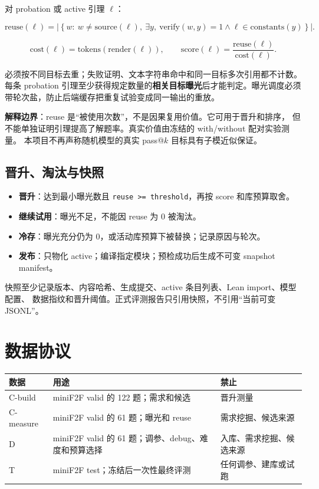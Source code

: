 \documentclass[UTF8,a4paper,11pt,fontset=windows]{ctexart}
\newcommand{\code}[1]{\texttt{\small #1}}
\begin{document}
对 probation 或 active 引理 $\ell$：

\[
\mathrm{reuse}(\ell)=
\left|\left\{w:\ w\ne\mathrm{source}(\ell),\
\exists y,\ \mathrm{verify}(w,y)=1\land
\ell\in\mathrm{constants}(y)\right\}\right|.
\]

\[
\mathrm{cost}(\ell)=\mathrm{tokens}(\mathrm{render}(\ell)),\qquad
\mathrm{score}(\ell)=\frac{\mathrm{reuse}(\ell)}{\mathrm{cost}(\ell)}.
\]

必须按不同目标去重；失败证明、文本字符串命中和同一目标多次引用都不计数。
每条 probation 引理至少获得规定数量的\textbf{相关目标曝光}后才能判定。曝光调度必须
带轮次盐，防止后端缓存把重复试验变成同一输出的重放。

\begin{warnbox}
\textbf{解释边界}：reuse 是“被使用次数”，不是因果复用价值。它可用于晋升和排序，
但不能单独证明引理提高了解题率。真实价值由冻结的 with/without 配对实验测量。
本项目不再声称随机模型的真实 pass@$k$ 目标具有子模近似保证。
\end{warnbox}

\subsection{晋升、淘汰与快照}

\begin{itemize}[leftmargin=1.8em,itemsep=3pt]
  \item \textbf{晋升}：达到最小曝光数且 \code{reuse >= threshold}，再按 score 和库预算取舍。
  \item \textbf{继续试用}：曝光不足，不能因 reuse 为 0 被淘汰。
  \item \textbf{冷存}：曝光充分仍为 0，或活动库预算下被替换；记录原因与轮次。
  \item \textbf{发布}：只物化 active；编译指定模块；预检成功后生成不可变 snapshot manifest。
\end{itemize}

快照至少记录版本、内容哈希、生成提交、active 条目列表、Lean import、模型配置、
数据指纹和晋升阈值。正式评测报告只引用快照，不引用“当前可变 JSONL”。

\section{数据协议}

\begin{table}[htbp]
\centering
\small
\begin{tabularx}{\textwidth}{@{}p{1.2cm}p{4.6cm}Y@{}}
\toprule
\textbf{数据} & \textbf{用途} & \textbf{禁止} \\
\midrule
C-build & miniF2F valid 的 122 题；需求和候选 & 晋升测量 \\
C-measure & miniF2F valid 的 61 题；曝光和 reuse & 需求挖掘、候选来源 \\
D & miniF2F valid 的 61 题；调参、debug、难度和预算选择 & 入库、需求挖掘、候选来源 \\
T & miniF2F test；冻结后一次性最终评测 & 任何调参、建库或试跑 \\
\bottomrule
\end{tabularx}
\end{table}
\end{document}
